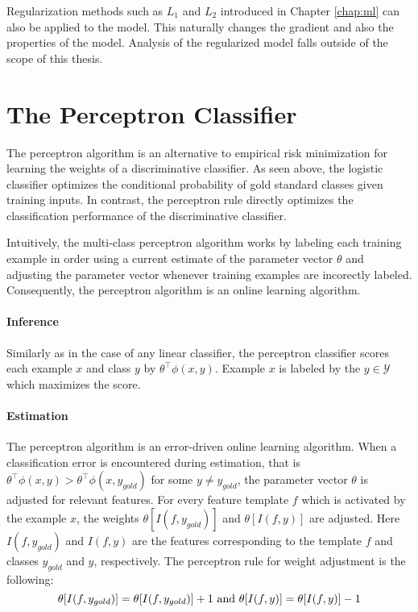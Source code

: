 Regularization methods such as $L_1$ and $L_2$ introduced in Chapter
\ref{chap:ml} can also be applied to the model. This naturally changes
the gradient and also the properties of the model. Analysis of the
regularized model falls outside of the scope of this thesis.

\section{The Perceptron Classifier}
\label{sec:perc}

The perceptron algorithm \citep{Rosenblatt1958} is an alternative to
empirical risk minimization for learning the weights of a
discriminative classifier. As seen above, the logistic classifier
optimizes the conditional probability of gold standard classes given
training inputs. In contrast, the perceptron rule directly optimizes
the classification performance of the discriminative classifier. 

Intuitively, the multi-class perceptron algorithm works by labeling
each training example in order using a current estimate of the
parameter vector $\theta$ and adjusting the parameter vector whenever
training examples are incorectly labeled. Consequently, the perceptron
algorithm is an online learning algorithm.

\paragraph{Inference} Similarly as in the case of any linear
classifier, the perceptron classifier scores each example $x$ and class $y$ by
$\theta^\top\phi(x,y)$. Example $x$ is labeled by the $y \in \mathcal{Y}$ which maximizes the score.


\paragraph{Estimation} The perceptron algorithm is an error-driven
online learning algorithm. When a classification error is encountered
during estimation, that is $\theta^\top\phi(x,y) >
\theta^\top\phi(x,y_{gold})$ for some $y \ne y_{gold}$, the parameter vector $\theta$ is
adjusted for relevant features. For every feature template $f$ which
is activated by the example $x$, the weights $\theta[I(f, y_{gold})]$
and $\theta[I(f, y)]$ are adjusted. Here $I(f, y_{gold})$ and $I(f,
y)$ are the features corresponding to the template $f$ and classes
$y_{gold}$ and $y$, respectively. The perceptron rule for weight
adjustment is the following:
$$\theta[I(f, y_{gold})] = \theta[I(f, y_{gold})] + 1 {\rm\ and\ }\theta[I(f, y)] = \theta[I(f, y)] - 1$$


